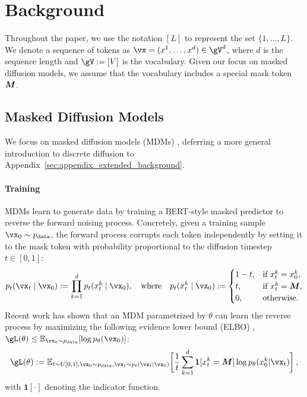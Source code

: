 \section{Background}

Throughout the paper, we use the notation $[L]$ to represent the set $\{1,\ldots, L\}$. We denote a sequence of tokens as $\vx = (x^1,\ldots,x^d) \in \gV^d$, where $d$ is the sequence length and $\gV := [V]$ is the vocabulary. Given our focus on masked diffusion models, we assume that the vocabulary includes a special mask token ${\bm{M}}$. %

\subsection{Masked Diffusion Models}
\label{sec:back_mdm}
We focus on masked diffusion models (MDMs) \citep{llada2025}, deferring a more general introduction to discrete diffusion to Appendix~\ref{sec:appendix_extended_background}.
\paragraph{Training} MDMs learn to generate data by training a BERT-style \citep{devlin2019bert} masked predictor to reverse the forward noising process. Concretely, given a training sample $\vx_0 \sim p_{\text{data}}$, the forward process corrupts each token independently by setting it to the mask token with probability proportional to the diffusion timestep $t \in [0, 1]$: 
\begin{align*}
    p_{t}(\vx_t \mid \vx_0) := \prod_{k=1}^d p_t(x_t^k \mid \vx_0), \quad \text{where} \quad
    p_t(x_t^k \mid \vx_0)
    :=
    \begin{cases}
        1 - t, & \text{if } x_t^k = x_0^k, \\
        t, & \text{if } x_t^k = \mask, \\
        0, & \text{otherwise.}
    \end{cases} 
\end{align*}
Recent work has shown that an MDM parametrized by $\theta$ can learn the reverse process by maximizing the following evidence lower bound (ELBO) \citep{ou2024your}, $\gL(\theta) \leq \mathbb{E}_{\vx_0 \sim p_\text{data}} [\log p_{\theta}(\vx_0)]$:
\begin{align}
\label{eq:mdm}
    \gL(\theta) := \mathbb{E}_{t \sim U[0,1], \vx_0 \sim p_{\text{data}}, \vx_t \sim p_t (\vx_t \mid \vx_0)} \bigg[ \frac{1}{t} \sum_{k=1}^d \mathbf{1}[ x_t^k = \mask] \log p_{\theta}(x_0^k | \vx_t)\bigg] \: ,
\end{align}
with $\mathbf{1}[\cdot]$ denoting the indicator function. %

